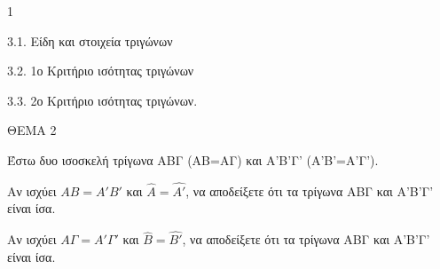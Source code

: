 \begin{ylh}{1}
    \item 3.1. Είδη και στοιχεία τριγώνων
    \item 3.2. 1ο Κριτήριο ισότητας τριγώνων
    \item 3.3. 2ο Κριτήριο ισότητας τριγώνων.
\end{ylh}

ΘΕΜΑ 2

Έστω δυο ισοσκελή τρίγωνα ΑΒΓ (ΑΒ=ΑΓ) και Α'Β'Γ' (Α'Β'=Α'Γ').

\begin{alist}
\item Αν ισχύει $AB = A'B'$ και $\widehat{A} = \widehat{A'}$, να αποδείξετε ότι τα τρίγωνα ΑΒΓ και Α'Β'Γ' είναι ίσα. 

\begin{center}
\end{center}

\item Αν ισχύει $A\Gamma = A'\Gamma'$ και $\widehat{B} = \widehat{B'}$, να αποδείξετε ότι τα τρίγωνα ΑΒΓ και Α'Β'Γ' είναι ίσα. 
\end{alist}
